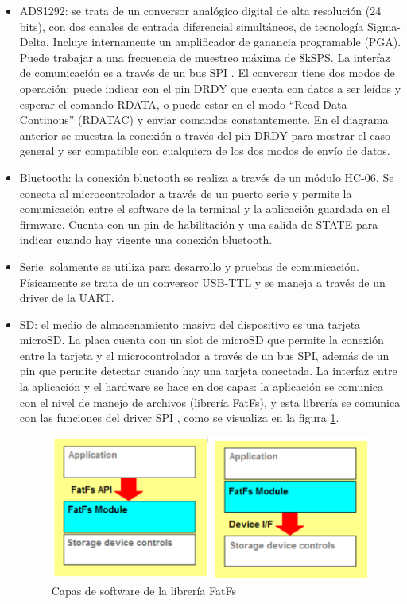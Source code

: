 \begin{itemize}
	\item ADS1292: se trata de un conversor analógico digital de alta resolución (24 bits), con dos canales de entrada diferencial simultáneos, de tecnología Sigma-Delta. Incluye internamente un amplificador de ganancia programable (PGA). Puede trabajar a una frecuencia de muestreo máxima de 8kSPS. La interfaz de comunicación es a través de un bus SPI \citep{texas2012} . El conversor tiene dos modos de operación: puede indicar con el pin DRDY que cuenta con datos a ser leídos y esperar el comando RDATA, o puede estar en el modo “Read Data Continous” (RDATAC) y enviar comandos constantemente. En el diagrama anterior se muestra la conexión a través del pin DRDY para mostrar el caso general y ser compatible con cualquiera de los dos modos de envío de datos.
	\item Bluetooth: la conexión bluetooth se realiza a través de un módulo HC-06. Se conecta al microcontrolador a través de un puerto serie y permite la comunicación entre el software de la terminal y la aplicación guardada en el firmware. Cuenta con un pin de habilitación y una salida de STATE para indicar cuando hay vigente una conexión bluetooth.
	\item Serie: solamente se utiliza para desarrollo y pruebas de comunicación. Físicamente se trata de un conversor USB-TTL y se maneja a través de un driver de la UART.
	\item SD: el medio de almacenamiento masivo del dispositivo es una tarjeta microSD. La placa cuenta con un slot de microSD que permite la conexión entre la tarjeta y el microcontrolador a través de un bus SPI, además de un pin que permite detectar cuando hay una tarjeta conectada. La interfaz entre la aplicación y el hardware se hace en dos capas: la aplicación se comunica con el nivel de manejo de archivos (librería FatFs), y esta librería se comunica con las funciones del driver SPI \citep{chan2014}, como se visualiza en la figura \ref{fig:capasFatFs}.
	
\begin{figure}[!htbp]
	\centering
	\includegraphics[width=\textwidth]{./Figures/capasFatFs.png}
	\caption{Capas de software de la librería FatFs}
	\label{fig:capasFatFs}
\end{figure}	
	

\end{itemize}
